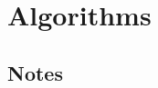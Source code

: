
\chapter{Algorithms}
\label{ch:algorithms}

\makeendnotes



%
%
\section*{Notes}
\begin{footnotesize}
\theendnotes
\end{footnotesize}
